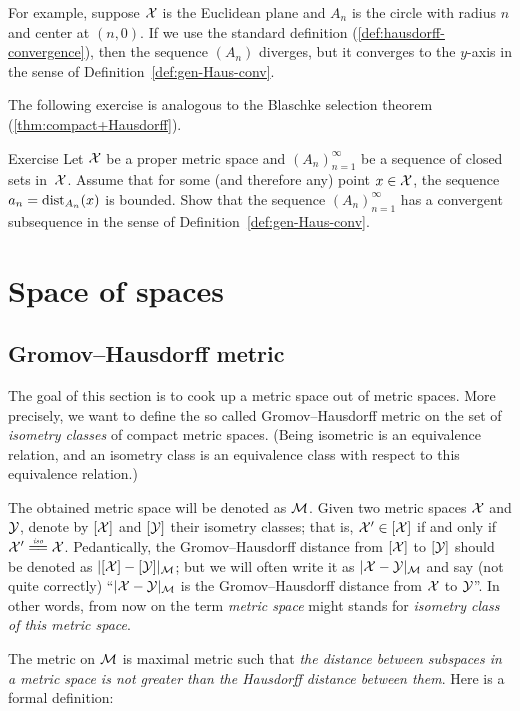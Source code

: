 For example, suppose $\mathcal{X}$ is the Euclidean plane and $A_n$ is the circle with radius $n$ and center at $(n,0)$.
If we use the standard definition (\ref{def:hausdorff-convergence}), then the sequence $(A_n)$ diverges, but it converges to the $y$-axis in the sense of Definition~\ref{def:gen-Haus-conv}.

The following exercise is analogous to the Blaschke selection theorem (\ref{thm:compact+Hausdorff}).

\begin{thm}{Exercise}
Let $\mathcal{X}$ be a proper metric space
and $(A_n)_{n=1}^\infty$ be a sequence of closed sets in~$\mathcal{X}$.
Assume that for some (and therefore any) point  $x\in\mathcal{X}$, 
the sequence $a_n=\mathrm{dist}_{A_n}(x)$ is bounded.
Show that the sequence  $(A_n)_{n=1}^\infty$ has a convergent subsequence in the sense of Definition~\ref{def:gen-Haus-conv}.
\end{thm}

\chapter{Space of spaces}

\section{Gromov--Hausdorff metric}

The goal of this section is to cook up a metric space out of metric spaces.
More precisely, we want to define the so called  Gromov--Hausdorff metric on the set of \emph{isometry classes} of compact metric spaces.
(Being isometric is an equivalence relation, 
and an isometry class is an equivalence class with respect to this equivalence relation.)

The obtained metric space will be denoted as $\mathcal{M}$.
Given two metric spaces $\mathcal{X}$ and $\mathcal{Y}$,
denote by $[\mathcal{X}]$ and $[\mathcal{Y}]$ their isometry classes;
that is, $\mathcal{X}'\in [\mathcal{X}]$ if and only if $\spc{X}'\iso \spc{X}$.
Pedantically, the Gromov--Hausdorff distance from $[\mathcal{X}]$ 
to $[\mathcal{Y}]$ should be denoted as $|[\mathcal{X}]-[\mathcal{Y}]|_{\mathcal{M}}$;
but we will often write it as $|\mathcal{X}-\mathcal{Y}|_{\mathcal{M}}$ and say (not quite correctly) 
``$|\mathcal{X}-\mathcal{Y}|_{\mathcal{M}}$ is the Gromov--Hausdorff distance from  $\mathcal{X}$ 
to  $\mathcal{Y}$''.
In other words, from now on the term \emph{metric space} might stands for \emph{isometry class of this metric space}.

The metric on $\mathcal{M}$ is maximal metric such that \emph{the distance between subspaces in a metric space is not greater than the Hausdorff distance between them}.
Here is a formal definition:

